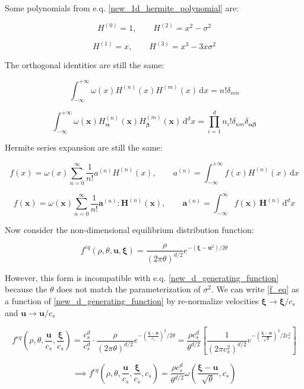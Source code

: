 \documentclass[draft]{article}
\begin{document}
Some polynomials from e.q. \eqref{new_1d_hermite_polynomial} are:

$$
H^{(0)} = 1, \qquad H^{(2)} = x^2 - \sigma^2
$$

$$
H^{(1)} = x, \qquad H^{(3)} = x^3 - 3x\sigma^2
$$

The orthogonal identities are still the same:

$$
\int_{-\infty}^{+\infty} \omega(x) H^{(n)} (x) H^{(m)} (x) \, \text{d}x = n! \delta_{nm}
$$

$$
\int_{-\infty}^{+\infty} \omega(\bm{x}) H^{(n)}_{\bm{\alpha}}(\bm{x}) H^{(m)}_{\bm{\beta}}(\bm{x}) \, \text{d}^d x = \prod_{i=1}^{d} n_i! \delta_{nm} \delta_{\bm{\alpha} \bm{\beta}}
$$

Hermite series expansion are still the same:

$$
f(x) = \omega(x) \sum_{n=0}^{\infty} \frac{1}{n!} a^{(n)} H^{(n)} (x), \qquad a^{(n)} = \int_{-\infty}^{+\infty} f(x) H^{(n)}(x) \, \text{d}x
$$

$$
f(\bm{x}) = \omega(\bm{x}) \sum_{n=0}^{\infty} \frac{1}{n!} \bm{a}^{(n)}:\bm{H}^{(n)}(\bm{x}), \qquad 	\bm{a}^{(n)} = \int_{-\infty}^{\infty} f(\bm{x}) \, \bm{H}^{(n)} \, \text{d}^d x
$$

Now consider the non-dimensional equilibrium distribution function:

\begin{equation}
	f^{eq} (\rho, \theta, \bm{u}, \bm{\xi}) = \frac{\rho}{(2\pi\theta)^{d/2}} e^{-(\bm{\xi} - \bm{u}^2) / 2\theta } \label{f_eq}
\end{equation}

However, this form is incompatible with e.q. \eqref{new_d_generating_function} because the $\theta$ does not match the parameterization of $\sigma^2$. We can write \eqref{f_eq} as a function of \eqref{new_d_generating_function} by re-normalize velocities $\bm{\xi} \rightarrow \bm{\xi} / c_s$ and $\bm{u} \rightarrow \bm{u} / c_s$

$$
f^{eq} \left ( \rho, \theta, \frac{\bm{u}}{c_s}, \frac{\bm{\xi}}{c_s} \right ) = \frac{c_s^d}{c_s^d} \cdot \frac{\rho}{(2\pi \theta)^{d/2}} e^{-(\frac{\bm{\xi} - \bm{u}}{c_s})^2 / 2 \theta} = \frac{\rho c_s^d}{\theta^{d/2}} \left [ \frac{1}{(2\pi c_s^2)^{d/2}} e^{-(\frac{\bm{\xi} - \bm{u}}{\sqrt{\theta}})^2 / 2 c_s^2} \right ]
$$

\begin{equation}
	\implies f^{eq} \left ( \rho, \theta, \frac{\bm{u}}{c_s}, \frac{\bm{\xi}}{c_s}, c_s \right ) = \frac{\rho c_s^d}{\theta^{d/2}} \omega \left ( \frac{\bm{\xi} - \bm{u}}{\sqrt{\theta}}, c_s \right ) \label{f_eq_2nd_form}
\end{equation}
\end{document}

